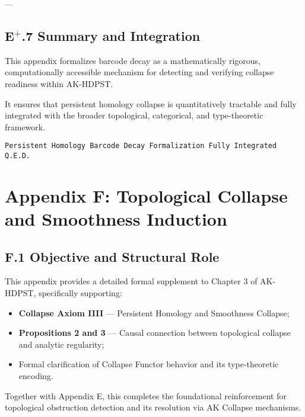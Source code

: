 \documentclass[11pt]{article}
\begin{document}
---

\subsection*{E$^{+}$.7 Summary and Integration}

This appendix formalizes barcode decay as a mathematically rigorous, computationally accessible mechanism for detecting and verifying collapse readiness within AK-HDPST.

It ensures that persistent homology collapse is quantitatively tractable and fully integrated with the broader topological, categorical, and type-theoretic framework.

\begin{flushright}
\texttt{Persistent Homology Barcode Decay Formalization \quad Fully Integrated \quad Q.E.D.}
\end{flushright}



\section*{Appendix F: Topological Collapse and Smoothness Induction}

\subsection*{F.1 Objective and Structural Role}

This appendix provides a detailed formal supplement to Chapter 3 of AK-HDPST, specifically supporting:

\begin{itemize}
    \item \textbf{Collapse Axiom IIII} — Persistent Homology and Smoothness Collapse;
    \item \textbf{Propositions 2 and 3} — Causal connection between topological collapse and analytic regularity;
    \item Formal clarification of Collapse Functor behavior and its type-theoretic encoding.
\end{itemize}

Together with Appendix E, this completes the foundational reinforcement for topological obstruction detection and its resolution via AK Collapse mechanisms.
\end{document}
